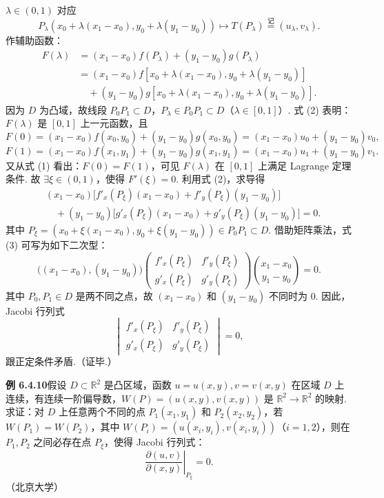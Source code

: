 \documentclass[UTF8, 12pt, fontset=fandol, oneside]{ctexart}
\begin{document}
$\lambda\in(0,1)$ 对应
\[
  P_\lambda(x_0+\lambda(x_1-x_0),y_0+\lambda(y_1-y_0))\mapsto T(P_\lambda)\overset{\text{记}}{=}(u_\lambda,v_\lambda).
\]
作辅助函数：
\begin{equation}
\begin{aligned}
  F(\lambda)
  &=(x_1-x_0)f(P_\lambda)+(y_1-y_0)g(P_\lambda)\\
  &=(x_1-x_0)f[x_0+\lambda(x_1-x_0),y_0+\lambda(y_1-y_0)]\\
  &\quad +(y_1-y_0)g[x_0+\lambda(x_1-x_0),y_0+\lambda(y_1-y_0)].
\end{aligned}
\end{equation}
因为 $D$ 为凸域，故线段 $P_0P_1\subset D$，$P_\lambda\in P_0P_1\subset D$（$\lambda\in[0,1]$）. 式 (2) 表明：$F(\lambda)$ 是 $[0,1]$ 上一元函数，且
\[
  F(0)=(x_1-x_0)f(x_0,y_0)+(y_1-y_0)g(x_0,y_0)
  =(x_1-x_0)u_0+(y_1-y_0)v_0,
\]
\[
  F(1)=(x_1-x_0)f(x_1,y_1)+(y_1-y_0)g(x_1,y_1)
  =(x_1-x_0)u_1+(y_1-y_0)v_1.
\]
又从式 (1) 看出：$F(0)=F(1)$，可见 $F(\lambda)$ 在 $[0,1]$ 上满足 Lagrange 定理条件. 故 $\exists\xi\in(0,1)$，使得 $F'(\xi)=0$. 利用式 (2)，求导得
\begin{equation}
\begin{aligned}
  &(x_1-x_0)\bigl[f'_x(P_\xi)(x_1-x_0)+f'_y(P_\xi)(y_1-y_0)\bigr]\\
  &\quad +(y_1-y_0)\bigl[g'_x(P_\xi)(x_1-x_0)+g'_y(P_\xi)(y_1-y_0)\bigr]=0.
\end{aligned}
\end{equation}
其中 $P_\xi=(x_0+\xi(x_1-x_0),y_0+\xi(y_1-y_0))\in P_0P_1\subset D$. 借助矩阵乘法，式 (3) 可写为如下二次型：
\[
  \bigl((x_1-x_0),(y_1-y_0)\bigr)
  \begin{pmatrix}
    f'_x(P_\xi) & f'_y(P_\xi)\\
    g'_x(P_\xi) & g'_y(P_\xi)
  \end{pmatrix}
  \binom{x_1-x_0}{y_1-y_0}=0.
\]
其中 $P_0,P_1\in D$ 是两不同之点，故 $(x_1-x_0)$ 和 $(y_1-y_0)$ 不同时为 $0$. 因此，Jacobi 行列式
\[
  \begin{vmatrix}
    f'_x(P_\xi) & f'_y(P_\xi)\\
    g'_x(P_\xi) & g'_y(P_\xi)
  \end{vmatrix}
  =0,
\]
跟正定条件矛盾.（证毕.）

\noindent\textbf{例 6.4.10}\quad 假设 $D\subset\mathbb R^2$ 是凸区域，函数 $u=u(x,y),v=v(x,y)$ 在区域 $D$ 上连续，有连续一阶偏导数，$W(P)=(u(x,y),v(x,y))$ 是 $\mathbb R^2\to\mathbb R^2$ 的映射. 求证：对 $D$ 上任意两个不同的点 $P_1(x_1,y_1)$ 和 $P_2(x_2,y_2)$，若 $W(P_1)=W(P_2)$，其中 $W(P_i)=(u(x_i,y_i),v(x_i,y_i))$（$i=1,2$），则在 $P_1,P_2$ 之间必存在点 $P_\xi$，使得 Jacobi 行列式：
\[
  \left.\frac{\partial(u,v)}{\partial(x,y)}\right|_{P_\xi}=0.
\]
（北京大学）
\end{document}
